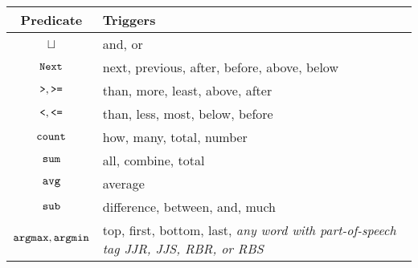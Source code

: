 \begin{tabular}{cl} \toprule
\textbf{Predicate} & \textbf{Triggers} \\ \midrule
$\sqcup$ & and, or \\
$\texttt{Next}$ & next, previous, after, before, above, below \\
$\texttt{>}, \texttt{>=}$ & than, more, least, above, after \\
$\texttt{<}, \texttt{<=}$ & than, less, most, below, before \\
$\texttt{count}$ & how, many, total, number \\
$\texttt{sum}$ & all, combine, total \\
$\texttt{avg}$ & average \\
$\texttt{sub}$ & difference, between, and, much \\
$\texttt{argmax}, \texttt{argmin}$ & top, first, bottom, last, \emph{any word with part-of-speech tag JJR, JJS, RBR, or RBS}
\\ \bottomrule
\end{tabular}